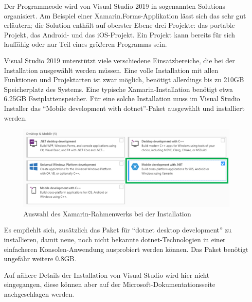 Der Programmcode wird von Visual Studio 2019 in sogenannten Solutions organisiert.
Am Beispiel einer Xamarin.Forms-Applikation lässt sich das sehr gut erläutern;
die Solution enthält auf oberster Ebene drei Projekte: das portable Projekt, das Android- und das iOS-Projekt.
Ein Projekt kann bereits für sich lauffähig oder nur Teil eines größeren Programms sein.\par

Visual Studio 2019 unterstützt viele verschiedene Einsatzbereiche, die bei der Installation ausgewählt werden müssen.
Eine volle Installation mit allen Funktionen und Projektarten ist zwar möglich, benötigt allerdings bis zu 210GB Speicherplatz des Systems.
Eine typische Xamarin-Installation benötigt etwa 6.25GB Festplattenspeicher.
Für eine solche Installation muss im Visual Studio Installer das \enquote{Mobile development with \ac{dotnet}}-Paket ausgewählt und installiert werden.
\begin{figure}[H]
    \centering\includegraphics[width=0.9\linewidth]{images/auswahl_rahmenwerk/installation.png}    
    \caption{Auswahl des Xamarin-Rahmenwerks bei der Installation}
\end{figure}
Es empfiehlt sich, zusätzlich das Paket für \enquote{\ac{dotnet} desktop development} zu installieren, damit neue, noch nicht bekannte \ac{dotnet}-Technologien in einer einfacheren Konsolen-Anwen\-dung ausprobiert werden können.
Das Paket benötigt ungefähr weitere 0.8GB.\par
Auf nähere Details der Installation von Visual Studio wird hier nicht eingegangen, diese können aber auf der Microsoft-Dokumentationsseite \cite[vgl.][]{msdoc-vs-install} nachgeschlagen werden.
%
